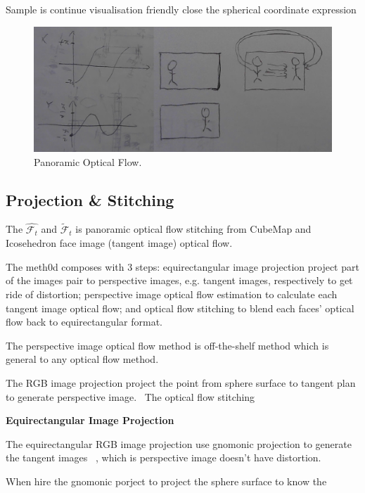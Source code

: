 Sample is continue 
visualisation friendly
close the spherical coordinate expression

\begin{figure}[hbt!]
	\centering
	\includegraphics[width=0.80\linewidth]{images/wrap-around-0.jpg}
	\caption{Panoramic Optical Flow.}
	\label{fig:app:warparound}
\end{figure}


\subsection{Projection \& Stitching}
\label{sec:approach:projstit}

The $\hat{\mathcal{F}_t}$ and $\tilde{\mathcal{F}}_t$ is panoramic optical flow stitching from CubeMap and Icosehedron face image (tangent image) optical flow.

The meth0d composes with 3 steps:
 equirectangular image projection project part of the images pair to perspective images, e.g. tangent images, respectively to get ride of distortion;
 perspective image optical flow estimation to calculate each tangent image optical flow;
 and optical flow stitching to blend each faces' optical flow back to equirectangular format. 
 
 The perspective image optical flow method is off-the-shelf method which is general to any optical flow method.

The RGB image projection project the point from sphere surface to tangent plan to generate perspective image.~\cite{??}
The optical flow stitching 

\textbf{Equirectangular Image Projection}


The equirectangular RGB image projection use gnomonic projection to generate the tangent images ~\cite{??}, which is perspective image doesn't have distortion.

When hire the gnomonic porject to project the sphere surface to know the 

